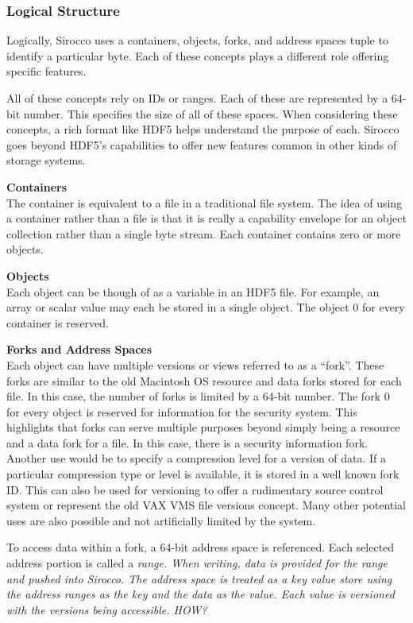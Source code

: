 \subsubsection{Logical Structure}
Logically, Sirocco uses a containers, objects, forks, and address spaces tuple to identify a particular byte. Each of these concepts plays a different role offering specific features.

All of these concepts rely on IDs or ranges. Each of these are represented by a 64-bit number. This specifies the size of all of these spaces. When considering these concepts, a rich format like HDF5 helps understand the purpose of each. Sirocco goes beyond HDF5's capabilities to offer new features common in other kinds of storage systems.

\noindent\textbf{Containers}\\
The container is equivalent to a file in a traditional file system. The idea of
using a container rather than a file is that it is really a capability envelope
for an object collection rather than a single byte stream. Each container
contains zero or more objects.

\noindent\textbf{Objects}\\
Each object can be though of as a variable in an HDF5 file. For example, an
array or scalar value may each be stored in a single object. The object 0 for
every container is reserved.

\noindent\textbf{Forks and Address Spaces}\\
Each object can have multiple versions or views referred to as a ``fork''.
These forks are similar to the old Macintosh OS resource and data forks stored
for each file. In this case, the number of forks is limited by a 64-bit number.
The fork 0 for every object is reserved for information for the security
system. This highlights that forks can serve multiple purposes beyond simply
being a resource and a data fork for a file. In this case, there is a security
information fork. Another use would be to specify a compression level for a
version of data. If a particular compression type or level is available, it is
stored in a well known fork ID. This can also be used for versioning to offer a
rudimentary source control system or represent the old VAX VMS file versions
concept. Many other potential uses are also possible and not artificially
limited by the system.

To access data within a fork, a 64-bit address space is referenced. Each
selected address portion is called a \em{range}. When writing, data is provided
for the range and pushed into Sirocco. The address space is treated as a key
value store using the address ranges as the key and the data as the value. Each
value is versioned with the versions being accessible. HOW?

